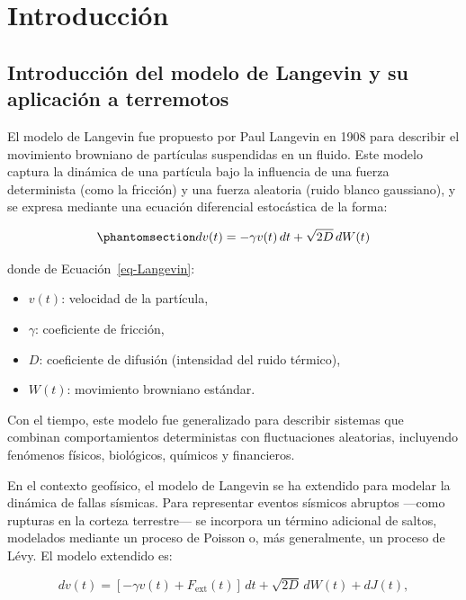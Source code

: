 \documentclass[
  spanish,
  us-letterpaper,
]{scrreprt}
\providecommand{\tightlist}{%
  \setlength{\itemsep}{0pt}\setlength{\parskip}{0pt}}
\theoremstyle{plain}
\theoremstyle{plain}
\theoremstyle{plain}
\theoremstyle{definition}
\theoremstyle{remark}
\begin{document}
\chapter{Introducción}\label{introducciuxf3n}

\section{Introducción del modelo de Langevin y su aplicación a
terremotos}\label{introducciuxf3n-del-modelo-de-langevin-y-su-aplicaciuxf3n-a-terremotos}

El modelo de Langevin fue propuesto por Paul Langevin en 1908 para
describir el movimiento browniano de partículas suspendidas en un
fluido. Este modelo captura la dinámica de una partícula bajo la
influencia de una fuerza determinista (como la fricción) y una fuerza
aleatoria (ruido blanco gaussiano), y se expresa mediante una ecuación
diferencial estocástica de la forma:

\begin{equation}\phantomsection\label{eq-Langevin}{ 
dv(t) = -\gamma v(t)\,dt + \sqrt{2D}\,dW(t) 
}\end{equation}

donde de Ecuación~\ref{eq-Langevin}:

\begin{itemize}
\tightlist
\item
  \(v(t)\): velocidad de la partícula,
\item
  \(\gamma\): coeficiente de fricción,
\item
  \(D\): coeficiente de difusión (intensidad del ruido térmico),
\item
  \(W(t)\): movimiento browniano estándar.
\end{itemize}

Con el tiempo, este modelo fue generalizado para describir sistemas que
combinan comportamientos deterministas con fluctuaciones aleatorias,
incluyendo fenómenos físicos, biológicos, químicos y financieros.

En el contexto geofísico, el modelo de Langevin se ha extendido para
modelar la dinámica de fallas sísmicas. Para representar eventos
sísmicos abruptos ---como rupturas en la corteza terrestre--- se
incorpora un término adicional de saltos, modelados mediante un proceso
de Poisson o, más generalmente, un proceso de Lévy. El modelo extendido
es:

\[
dv(t) = [-\gamma v(t) + F_{\text{ext}}(t)]\,dt + \sqrt{2D}\,dW(t) + dJ(t),
\]
\end{document}
